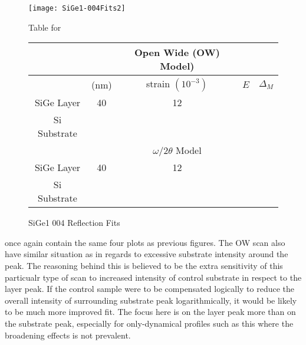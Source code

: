 \begin{figure}[hc]%
\caption{SiGe1 004 Reflection Fits}
\label{SiGe1-004}
\begin{minipage}{0.85\linewidth}
\texttt{[image: SiGe1-004Fits2]}
\end{minipage}
\begin{minipage}{\linewidth}
\centering
\vspace{10pt}
Table for \\
\vspace{5pt}
\begin{tabular}{c|cccc}
			& 	&Open Wide (OW) Model)	 \\
\hline
			&	(nm)	&	strain	 $(10^{-3})$&	$E$&  $\Delta_M$\\
\hline
SiGe Layer		&  	40	&      12	 &\textendash & \textendash\ 	\\
Si Substrate		&	\textemdash & \textemdash&\textemdash\ &\textemdash	\\
\hline
			& &$\omega/2\theta$ Model \\
\hline
SiGe Layer		&	40	& 12	&\textendash	&\textendash\ 	\\
Si Substrate		&	\textemdash & \textemdash&\textemdash\ &\textemdash
\end{tabular}
\end{minipage}
\end{figure}

 once again contain the same four plots as previous figures.  The OW scan also have similar situation as  in regards to excessive substrate intensity around the peak.  The reasoning behind this is believed to be the extra sensitivity of this particualr type of scan to increased intensity of control substrate in respect to the layer peak.  If the control sample were to be compensated logically to reduce the overall intensity of surrounding substrate peak logarithmically, it would be likely to be much more improved fit.  The focus here is on the layer peak more than on the substrate peak, especially for only-dynamical profiles such as this where the broadening effects is not prevalent.

